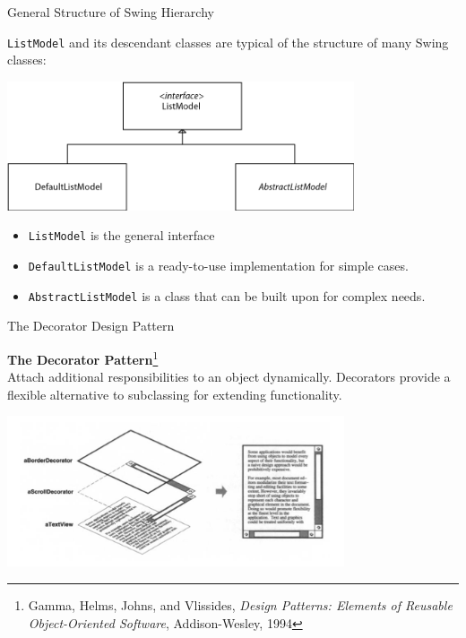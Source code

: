 \documentclass{beamer}
\begin{document}
\begin{frame}[fragile]{General Structure of Swing Hierarchy}


{\tt ListModel} and its descendant classes are typical of the structure of many Swing classes:
\begin{center}
\includegraphics[height=1.5in]{list-model-hierarchy.png}
\end{center}

\begin{itemize}
\item {\tt ListModel} is the general interface
\item {\tt DefaultListModel} is a ready-to-use implementation for simple cases.
\item {\tt AbstractListModel} is a class that can be built upon for complex needs.
\end{itemize}


\end{frame}

\begin{frame}[fragile]{The Decorator Design Pattern}


{\bf The Decorator Pattern}\footnote{Gamma, Helms, Johns, and Vlissides, {\it Design Patterns: Elements of Reusable Object-Oriented Software}, Addison-Wesley, 1994}\\
Attach additional responsibilities to an object dynamically. Decorators provide a flexible alternative to subclassing for extending functionality.\\

\begin{center}
\includegraphics[height=1.75in]{gof-decorator-diagram.png}
\end{center}



\end{frame}
\end{document}
